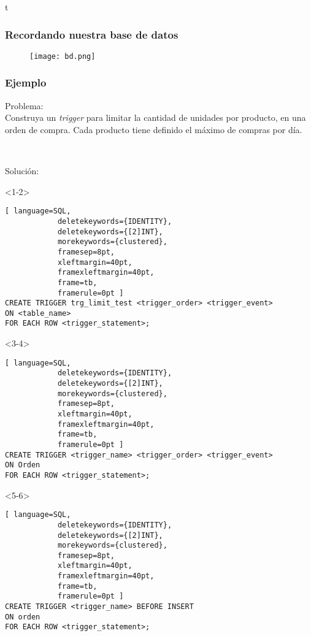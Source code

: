 
\begin{frame}{t}
	
	\frametitle{Recordando nuestra base de datos}
	
	\begin{figure}[h]
		\centering
		\texttt{[image: bd.png]}
	\end{figure}
	
	
\end{frame}


\begin{frame}[fragile]
	
	\frametitle{Ejemplo}
	
	Problema: \\
	Construya un \emph{trigger} para limitar la cantidad de unidades por producto, en una orden de compra. Cada producto tiene definido el máximo de compras por día.
	
	\ 
	
	Solución: \\
	
	\begin{onlyenv}<1-2>
		\begin{lstlisting}[ language=SQL,
			deletekeywords={IDENTITY},
			deletekeywords={[2]INT},
			morekeywords={clustered},
			framesep=8pt,
			xleftmargin=40pt,
			framexleftmargin=40pt,
			frame=tb,
			framerule=0pt ]
CREATE TRIGGER trg_limit_test <trigger_order> <trigger_event> 
ON <table_name> 
FOR EACH ROW <trigger_statement>;
\end{lstlisting}
	\end{onlyenv}

	\begin{onlyenv}<3-4>
		\begin{lstlisting}[ language=SQL,
			deletekeywords={IDENTITY},
			deletekeywords={[2]INT},
			morekeywords={clustered},
			framesep=8pt,
			xleftmargin=40pt,
			framexleftmargin=40pt,
			frame=tb,
			framerule=0pt ]
CREATE TRIGGER <trigger_name> <trigger_order> <trigger_event> 
ON Orden
FOR EACH ROW <trigger_statement>;
\end{lstlisting}
	\end{onlyenv}
	
	\begin{onlyenv}<5-6>
		\begin{lstlisting}[ language=SQL,
			deletekeywords={IDENTITY},
			deletekeywords={[2]INT},
			morekeywords={clustered},
			framesep=8pt,
			xleftmargin=40pt,
			framexleftmargin=40pt,
			frame=tb,
			framerule=0pt ]
CREATE TRIGGER <trigger_name> BEFORE INSERT 
ON orden
FOR EACH ROW <trigger_statement>;
\end{lstlisting}
	\end{onlyenv}
	

\end{frame}
